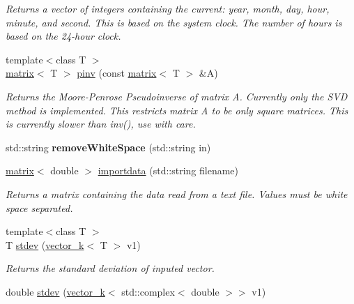 \begin{DoxyCompactItemize}
\begin{DoxyCompactList}\small\item\em Returns a vector of integers containing the current\-: year, month, day, hour, minute, and second. This is based on the system clock. The number of hours is based on the 24-\/hour clock. \end{DoxyCompactList}\item 
\hypertarget{namespacekeycpp_ac20bd2ef4fb18cbcdb0f462a89447bd7}{{\footnotesize template$<$class T $>$ }\\\hyperlink{classkeycpp_1_1matrix}{matrix}$<$ T $>$ \hyperlink{namespacekeycpp_ac20bd2ef4fb18cbcdb0f462a89447bd7}{pinv} (const \hyperlink{classkeycpp_1_1matrix}{matrix}$<$ T $>$ \&A)}\label{namespacekeycpp_ac20bd2ef4fb18cbcdb0f462a89447bd7}

\begin{DoxyCompactList}\small\item\em Returns the Moore-\/\-Penrose Pseudoinverse of matrix A. Currently only the S\-V\-D method is implemented. This restricts matrix A to be only square matrices. This is currently slower than inv(), use with care. \end{DoxyCompactList}\item 
\hypertarget{namespacekeycpp_ad70d9156c4b6a75e5b7a4c799f900162}{std\-::string {\bfseries remove\-White\-Space} (std\-::string in)}\label{namespacekeycpp_ad70d9156c4b6a75e5b7a4c799f900162}

\item 
\hypertarget{namespacekeycpp_ac5c0a8bc58229a412ec2068979b6b84e}{\hyperlink{classkeycpp_1_1matrix}{matrix}$<$ double $>$ \hyperlink{namespacekeycpp_ac5c0a8bc58229a412ec2068979b6b84e}{importdata} (std\-::string filename)}\label{namespacekeycpp_ac5c0a8bc58229a412ec2068979b6b84e}

\begin{DoxyCompactList}\small\item\em Returns a matrix containing the data read from a text file. Values must be white space separated. \end{DoxyCompactList}\item 
\hypertarget{namespacekeycpp_a61234b7bb0f3126b3db82634675c2951}{{\footnotesize template$<$class T $>$ }\\T \hyperlink{namespacekeycpp_a61234b7bb0f3126b3db82634675c2951}{stdev} (\hyperlink{classkeycpp_1_1vector__k}{vector\-\_\-k}$<$ T $>$ v1)}\label{namespacekeycpp_a61234b7bb0f3126b3db82634675c2951}

\begin{DoxyCompactList}\small\item\em Returns the standard deviation of inputed vector. \end{DoxyCompactList}\item 
\hypertarget{namespacekeycpp_abdec07a4c4dd0fc5de230a753bf59066}{double \hyperlink{namespacekeycpp_abdec07a4c4dd0fc5de230a753bf59066}{stdev} (\hyperlink{classkeycpp_1_1vector__k}{vector\-\_\-k}$<$ std\-::complex$<$ double $>$$>$ v1)}\label{namespacekeycpp_abdec07a4c4dd0fc5de230a753bf59066}


\end{DoxyCompactItemize}
